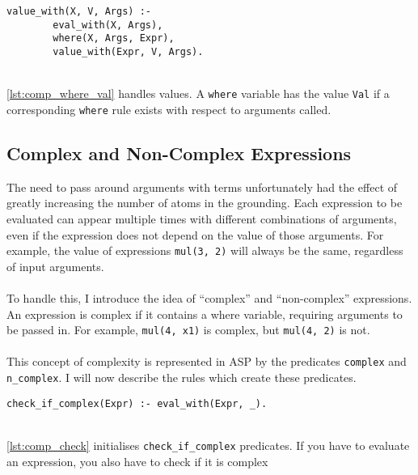 \begin{lstlisting}[caption={Handling where values}, label={lst:comp_where_val}, firstnumber=90]
value_with(X, V, Args) :- 
		eval_with(X, Args), 
		where(X, Args, Expr), 
		value_with(Expr, V, Args).
\end{lstlisting}
\mbox{} \\
\ref{lst:comp_where_val} handles values. A \lstinline!where! variable has the value \lstinline!Val! if a corresponding \lstinline!where! rule exists with respect to arguments called.

\subsection{Complex and Non-Complex Expressions}

The need to pass around arguments with terms unfortunately had the effect of greatly increasing the number of atoms in the grounding. Each expression to be evaluated can appear multiple times with different combinations of arguments, even if the expression does not depend on the value of those arguments. For example, the value of expressions \lstinline!mul(3, 2)! will always be the same, regardless of input arguments. \\ \\
To handle this, I introduce the idea of ``complex'' and ``non-complex'' expressions. An expression is complex if it contains a where variable, requiring arguments to be passed in. For example, \lstinline!mul(4, x1)! is complex, but \lstinline!mul(4, 2)! is not. \\ \\
This concept of complexity is represented in ASP by the predicates \lstinline!complex! and \lstinline!n_complex!. I will now describe the rules which create these predicates.\\

\begin{lstlisting}[caption={Check for complexity}, label={lst:comp_check}, firstnumber=149]
check_if_complex(Expr) :- eval_with(Expr, _).
\end{lstlisting}
\mbox{} \\
\ref{lst:comp_check} initialises \lstinline!check_if_complex! predicates. If you have to evaluate an expression, you also have to check if it is complex \\ \\
\mbox{}\\

